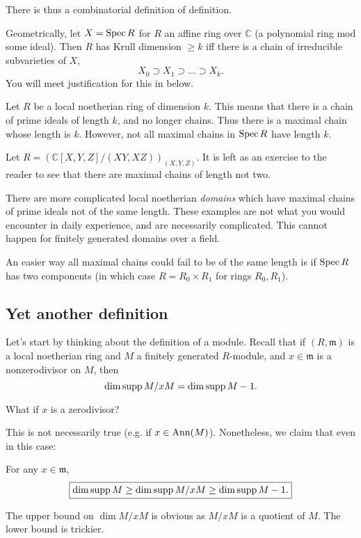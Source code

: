 There is thus a combinatorial definition of definition.

Geometrically, let $X = \operatorname{Spec} R$ for $R$ an affine ring over $\mathbb{C}$ (a
polynomial ring mod some ideal). Then $R$ has Krull dimension $\geq k$ iff there is a
chain of irreducible subvarieties of $X$,
\[ X_0 \supset X_1 \supset \dots \supset X_k . \]
You will meet justification for this in  below.

\begin{remark} Let $R$ be a local noetherian ring of dimension $k$. This
means that there is a chain of prime ideals of length $k$, and no longer
chains. Thus there is a maximal chain whose length is $k$. However, not all
maximal chains in $\operatorname{Spec} R$ have length $k$. 
\end{remark} 

\begin{example} 
Let $R =( \mathbb{C}[X,Y,Z]/(XY,XZ))_{(X,Y,Z)}$. It is left as an
exercise to the reader to see that there are maximal chains of
length not two.

There are more complicated local noetherian \emph{domains} which have maximal
chains of prime ideals not of the same length. These examples are not what you
would encounter in daily experience, and are necessarily complicated. This
cannot happen for finitely generated domains over a field.
\end{example} 

\begin{example} 
An easier way all maximal chains could fail to be of the same length is if
$\operatorname{Spec} R$ has two components (in which case $R = R_0 \times R_1$ for rings
$R_0, R_1$). 
\end{example} 


\subsection{Yet another definition}
Let's start by thinking about the definition of a module. Recall that if $(R,
\mathfrak{m})$ is
a local noetherian ring and $M$ a finitely generated $R$-module, and $x \in \mathfrak{m}$ is
a nonzerodivisor on $M$, then
\[ \dim \operatorname{supp} M/xM = \dim \operatorname{supp} M -1.  \]

\begin{question} 
What if $x$ is  a zerodivisor? 
\end{question} 

This is not necessarily true (e.g. if $x \in \operatorname{Ann}(M)$). Nonetheless, we claim
that even in this case:
\begin{proposition} 
For any $x \in \mathfrak{m}$,
\[ \boxed{ \dim \operatorname{supp} M \geq \dim \operatorname{supp} M/xM \geq \dim \operatorname{supp} M -1 .}\]
\end{proposition} 
The upper bound on $\dim M/xM$ is obvious as $M/xM$ is a quotient of $M$. The
lower bound is trickier. 

